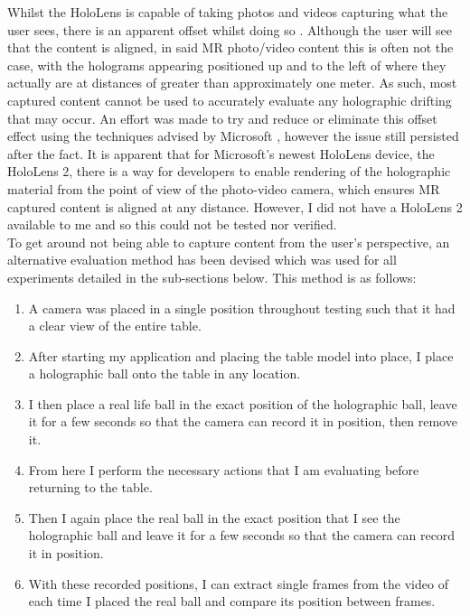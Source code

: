 \documentclass[ %
                author={Finn Alexander Wilkinson},
                supervisor={Dr. Andrew Calway},
                degree={MEng},
                title={\centering A Mixed Reality Aim Assistant for Pool and Snooker},
                subtitle={},
                type={Enterprise},
                year={2021} ]{dissertation}
\begin{document}
Whilst the HoloLens is capable of taking photos and videos capturing what the user sees, there is an apparent offset whilst doing so \cite{holographicDrift}. Although the user will see that the content is aligned, in said MR photo/video content this is often not the case, with the holograms appearing positioned up and to the left of where they actually are at distances of greater than approximately one meter. As such, most captured content cannot be used to accurately evaluate any holographic drifting that may occur. An effort was made to try and reduce or eliminate this offset effect using the techniques advised by Microsoft \cite{hololensFocusPoint}\cite{mixedRealityCapture}, however the issue still persisted after the fact. It is apparent that for Microsoft's newest HoloLens device, the HoloLens 2, there is a way for developers to enable rendering of the holographic material from the point of view of the photo-video camera, which ensures MR captured content is aligned at any distance\cite{hololensPVrender}. However, I did not have a HoloLens 2 available to me and so this could not be tested nor verified.\\

To get around not being able to capture content from the user's perspective, an alternative evaluation method has been devised which was used for all experiments detailed in the sub-sections below. This method is as follows:
\begin{enumerate}
    \item A camera was placed in a single position throughout testing such that it had a clear view of the entire table.
    \item After starting my application and placing the table model into place, I place a holographic ball onto the table in any location.
    \item I then place a real life ball in the exact position of the holographic ball, leave it for a few seconds so that the camera can record it in position, then remove it.
    \item From here I perform the necessary actions that I am evaluating before returning to the table.
    \item Then I again place the real ball in the exact position that I see the holographic ball and leave it for a few seconds so that the camera can record it in position.
    \item With these recorded positions, I can extract single frames from the video of each time I placed the real ball and compare its position between frames.
\end{enumerate}
\end{document}

